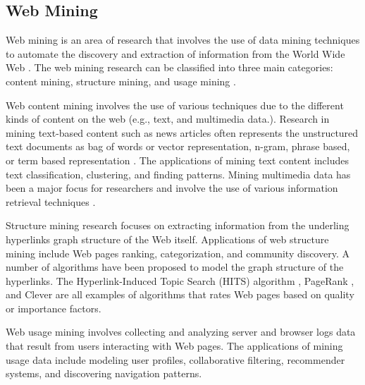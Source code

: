 \subsection{Web Mining}
Web mining is an area of research that involves the use of data mining techniques to automate the discovery and extraction of information from the World Wide Web \cite{etzioni_1996_Communication_ACM}.
The web mining research can be classified into three main categories: content mining, structure mining, and usage mining \cite{madria_1999_Springer,kosala_2000_Survey}.

Web content mining involves the use of various techniques due to the different kinds of content on the web (e.g., text, and multimedia data.).
Research in mining text-based content such as news articles often represents the unstructured text documents as bag of words or vector representation, n-gram, phrase based, or term based representation \cite{manning_2008_intro_to_IR}.
The applications of mining text content includes text classification, clustering, and finding patterns.
Mining multimedia data has been a major focus for researchers  and involve the use of various information retrieval techniques \cite{Wang_2011_SIGIR, Wu_2011_WSDM}.

Structure mining research focuses on extracting information from the underling hyperlinks graph structure of the Web itself.
Applications of web structure mining include Web pages ranking, categorization, and community discovery.
A number of algorithms have been proposed to model the graph structure of the hyperlinks.
The Hyperlink-Induced Topic Search (HITS) algorithm \cite{Kleinberg_1999_JACM}, PageRank \cite{Brin_1998_PageRank}, and Clever \cite{chakrabarti_1999_Computer} are all examples of algorithms that rates Web pages based on quality or importance factors. 

Web usage mining involves collecting and analyzing server and browser logs data that result from users interacting with Web pages.
The applications of mining usage data include modeling user profiles, collaborative filtering, recommender systems, and discovering navigation patterns.
